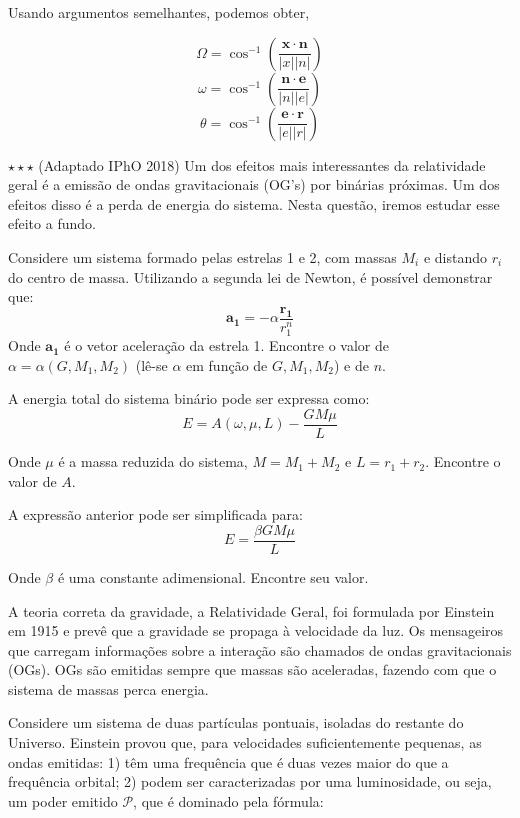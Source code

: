 \documentclass[11pt]{article}
\begin{document}
\begin{pproblem}
\begin{pssolution*}{}{}
\begin{alternativas}
            Usando argumentos semelhantes, podemos obter, 

            $$\Omega = \cos^{-1}\left(\frac{\mathbf{x}\cdot\mathbf{n}}{|x||n|}\right)$$
            $$\omega = \cos^{-1}\left(\frac{\mathbf{n}\cdot\mathbf{e}}{|n||e|}\right)$$
            $$\theta = \cos^{-1}\left(\frac{\mathbf{e}\cdot\mathbf{r}}{|e||r|}\right)$$
            
        \end{alternativas}
    \end{pssolution*}
\end{pproblem}

\begin{pproblem}\(\star\star\star\) (Adaptado IPhO 2018) Um dos efeitos mais interessantes da relatividade geral é a emissão de ondas gravitacionais (OG's) por binárias próximas. Um dos efeitos disso é a perda de energia do sistema. Nesta questão, iremos estudar esse efeito a fundo.

\begin{alternativas}
    \item Considere um sistema formado pelas estrelas 1 e 2, com massas \(M_i\) e distando \(r_i\) do centro de massa. Utilizando a segunda lei de Newton, é possível demonstrar que:
    \[\mathbf{a_1} = -\alpha \frac{\mathbf{r_1}}{r_1^n}\]
    Onde \(\mathbf{a_1}\) é o vetor aceleração da estrela 1. Encontre o valor de \(\alpha = \alpha (G, M_1, M_2)\) (lê-se \(\alpha\) em função de \(G, M_1, M_2\)) e de \(n\).

    \item A energia total do sistema binário pode ser expressa como:
    \[E = A(\omega, \mu, L) - \frac{GM\mu}{L}\]

    Onde \(\mu\) é a massa reduzida do sistema, \(M = M_1+M_2\) e \(L = r_1+r_2\). Encontre o valor de \(A\).

    \item A expressão anterior pode ser simplificada para:
    \[E = \frac{\beta GM\mu}{L}\]

    Onde \(\beta\) é uma constante adimensional. Encontre seu valor.

    A teoria correta da gravidade, a Relatividade Geral, foi formulada por Einstein em 1915 e prevê que a gravidade se propaga à velocidade da luz. Os mensageiros que carregam informações sobre a interação são chamados de ondas gravitacionais (OGs). OGs são emitidas sempre que massas são aceleradas, fazendo com que o sistema de massas perca energia.

    Considere um sistema de duas partículas pontuais, isoladas do restante do Universo. Einstein provou que, para velocidades suficientemente pequenas, as ondas emitidas: 1) têm uma frequência que é duas vezes maior do que a frequência orbital; 2) podem ser caracterizadas por uma luminosidade, ou seja, um poder emitido \(\mathcal{P}\), que é dominado pela fórmula:


\end{alternativas}
\end{pproblem}
\end{document}

